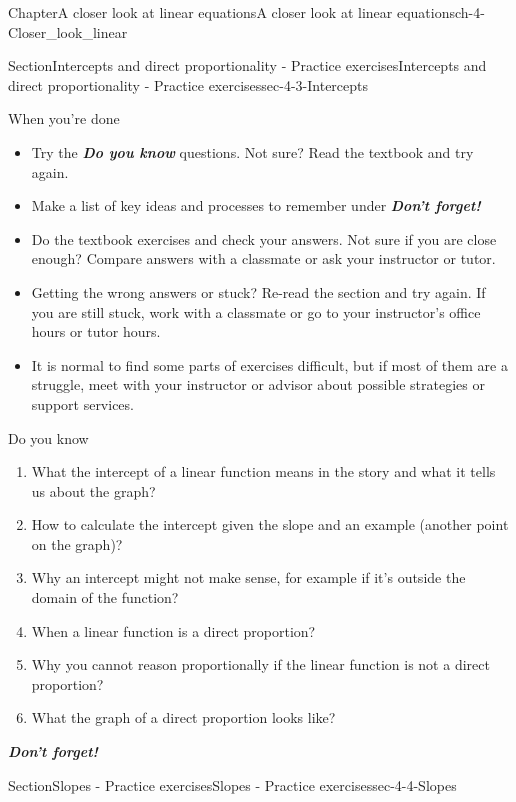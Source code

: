 \documentclass[twoside,11pt,]{book}
\newcommand{\alert}[1]{\textbf{\textit{#1}}}
\numberwithin{equation}{section}
\begin{document}
\begin{chapterptx}{Chapter}{A closer look at linear equations}{}{A closer look at linear equations}{}{}{ch-4-Closer_look_linear}
\begin{sectionptx}{Section}{Intercepts and direct proportionality - Practice exercises}{}{Intercepts and direct proportionality - Practice exercises}{}{}{sec-4-3-Intercepts}
\begin{conclusion}{When you're done \textellipsis{}}
\begin{itemize}[label=\textbullet]
\item{}Try the \alert{Do you know} questions. Not sure? Read the textbook and try again.%
\item{}Make a list of key ideas and processes to remember under \alert{Don't forget!}%
\item{}Do the textbook exercises and check your answers. Not sure if you are close enough? Compare answers with a classmate or ask your instructor or tutor.%
\item{}Getting the wrong answers or stuck? Re-read the section and try again. If you are still stuck, work with a classmate or go to your instructor's office hours or tutor hours.%
\item{}It is normal to find some parts of exercises difficult, but if most of them are a struggle, meet with your instructor or advisor about possible strategies or support services.%
\end{itemize}
%
\end{conclusion}%
\begin{conclusion}{Do you know \textellipsis{}}%
%
\begin{enumerate}[label={\Alph*.}]
\item{}What the intercept of a linear function means in the story and what it tells us about the graph?%
\item{}How to calculate the intercept given the slope and an example (another point on the graph)?%
\item{}Why an intercept might not make sense, for example if it's outside the domain of the function?%
\item{}When a linear function is a direct proportion?%
\item{}Why you cannot reason proportionally if the linear function is not a direct proportion?%
\item{}What the graph of a direct proportion looks like?%
\end{enumerate}
%
\par
\alert{Don't forget!}%
\end{conclusion}%
\end{sectionptx}
%
%
\typeout{************************************************}
\typeout{************************************************}
%
\begin{sectionptx}{Section}{Slopes - Practice exercises}{}{Slopes - Practice exercises}{}{}{sec-4-4-Slopes}
%
%
\typeout{************************************************}
\typeout{************************************************}

\end{sectionptx}
\end{chapterptx}
\end{document}
